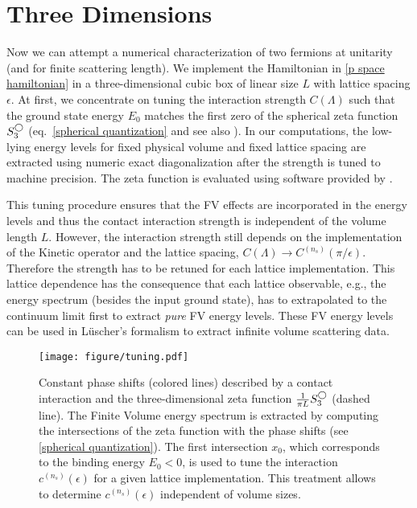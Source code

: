 \section{Three Dimensions}\label{sec:3D}


Now we can attempt a numerical characterization of two fermions at unitarity (and for finite scattering length).
We implement the Hamiltonian in \eqref{p space hamiltonian} in a three-dimensional cubic box of linear size $L$ with lattice spacing $\epsilon$.
At first, we concentrate on tuning the interaction strength $C(\Lambda)$ such that the ground state energy $E_0$ matches the first zero of the spherical zeta function $S^{\bigcirc}_3$ (eq.~\eqref{spherical quantization} and see also ).
In our computations, the low-lying energy levels for fixed physical volume and fixed lattice spacing are extracted using numeric exact diagonalization after the strength is tuned to machine precision.
The zeta function is evaluated using software provided by .

This tuning procedure ensures that the FV effects are incorporated in the energy levels and thus the contact interaction strength is independent of the volume length $L$.
However, the interaction strength still depends on the implementation of the Kinetic operator and the lattice spacing, $C(\Lambda)\to C^{(n_s)}(\pi/\epsilon)$.
Therefore the strength has to be retuned for each lattice implementation.
This lattice dependence has the consequence that each lattice observable, e.g., the energy spectrum (besides the input ground state), has to extrapolated to the continuum limit first to extract \textit{pure} FV energy levels.
These FV energy levels can be used in L\"uscher's formalism to extract infinite volume scattering data.

\begin{figure}
\center
\texttt{[image: figure/tuning.pdf]}
\caption{\label{fig:tuning}
    Constant phase shifts (colored lines) described by a contact interaction and the three-dimensional zeta function $\frac{1}{\pi L} S^{\bigcirc}_3$ (dashed line).
    The Finite Volume energy spectrum is extracted by computing the intersections of the zeta function with the phase shifts (see \eqref{spherical quantization}).
    The first intersection $x_0$, which corresponds to the binding energy $E_0 < 0$, is used to tune the interaction $c^{(n_s)}(\epsilon)$ for a given lattice implementation.
    This treatment allows to determine $c^{(n_s)}(\epsilon)$ independent of volume sizes.
}
\end{figure}


